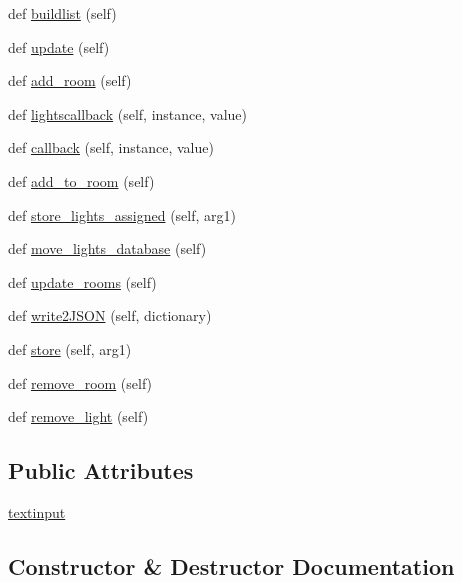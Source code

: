 \begin{DoxyCompactItemize}
\item 
def \hyperlink{classTestingGUI_1_1LightsView_ad567fc119c87bdf050d2d105cffb102e}{buildlist} (self)
\item 
def \hyperlink{classTestingGUI_1_1LightsView_ae28189742abd26346c227385fe8866c7}{update} (self)
\item 
def \hyperlink{classTestingGUI_1_1LightsView_ab04e59790bba8440f9f1d65e84bc8ae6}{add\+\_\+room} (self)
\item 
def \hyperlink{classTestingGUI_1_1LightsView_abc44bd1d87c0d060890ad095b6195d27}{lightscallback} (self, instance, value)
\item 
def \hyperlink{classTestingGUI_1_1LightsView_a6868b6f77d43e03f6568b62169c9b19c}{callback} (self, instance, value)
\item 
def \hyperlink{classTestingGUI_1_1LightsView_a38460cbc7553198ef9a613d09919e077}{add\+\_\+to\+\_\+room} (self)
\item 
def \hyperlink{classTestingGUI_1_1LightsView_a3ff5b4674219060370bd91c84e99513c}{store\+\_\+lights\+\_\+assigned} (self, arg1)
\item 
def \hyperlink{classTestingGUI_1_1LightsView_ad2a97175fc114e694c6fe598361c6334}{move\+\_\+lights\+\_\+database} (self)
\item 
def \hyperlink{classTestingGUI_1_1LightsView_add6c257a4625658791c08aca275dbe4d}{update\+\_\+rooms} (self)
\item 
def \hyperlink{classTestingGUI_1_1LightsView_a363b48af2153effb586500f5ca0f371d}{write2\+J\+S\+ON} (self, dictionary)
\item 
def \hyperlink{classTestingGUI_1_1LightsView_a956aabd6c68ac0028a5dbc46ae9475ad}{store} (self, arg1)
\item 
def \hyperlink{classTestingGUI_1_1LightsView_a5f41c66493303b7174b335356d4deee5}{remove\+\_\+room} (self)
\item 
def \hyperlink{classTestingGUI_1_1LightsView_aa302b8817251a5f3c0f2c0d153073399}{remove\+\_\+light} (self)
\end{DoxyCompactItemize}
\subsection*{Public Attributes}
\begin{DoxyCompactItemize}
\item 
\hyperlink{classTestingGUI_1_1LightsView_aa809676a8370b352332b15861fac843e}{textinput}
\end{DoxyCompactItemize}


\subsection{Constructor \& Destructor Documentation}
